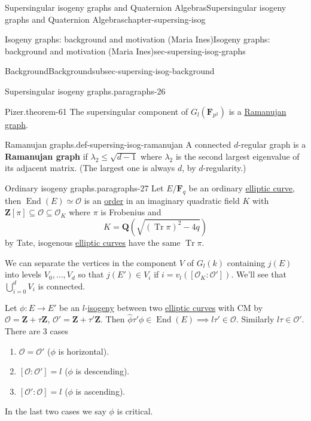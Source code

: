 \documentclass[oneside,10pt,]{book}
\newcommand{\terminology}[1]{\textbf{#1}}
\numberwithin{equation}{section}
\newcommand{\lb}{[}
\newcommand{\rb}{]}
\newcommand{\ZZ}{\mathbf{Z}}
\newcommand{\QQ}{\mathbf{Q}}
\newcommand{\FF}{\mathbf{F}}
\newcommand{\ints}{\mathcal{O}}
\DeclareMathOperator{\End}{End}
\DeclareMathOperator{\trace}{Tr}
\begin{document}
\begin{chapterptx}{Supersingular isogeny graphs and Quaternion Algebras}{}{Supersingular isogeny graphs and Quaternion Algebras}{}{}{chapter-supersing-isog}
\begin{sectionptx}{Isogeny graphs: background and motivation (Maria Ines)}{}{Isogeny graphs: background and motivation (Maria Ines)}{}{}{sec-supersing-isog-graphs}
\begin{subsectionptx}{Background}{}{Background}{}{}{subsec-supersing-isog-background}
\begin{paragraphs}{Supersingular isogeny graphs.}{paragraphs-26}
\begin{theorem}{Pizer.}{}{theorem-61}
\hypertarget{p-807}{}%
The supersingular component of \(G_l(\FF_{p^2})\) is a \hyperref[def-supersing-isog-ramanujan]{Ramanujan graph}.%
\end{theorem}
\begin{definition}{Ramanujan graphs.}{def-supersing-isog-ramanujan}%
\hypertarget{p-808}{}%
A connected \(d\)-regular graph is a \terminology{Ramanujan graph} if \(\lambda_2 \le \sqrt{d-1}\) where \(\lambda_2\) is the second largest eigenvalue of its adjacent matrix. (The largest one is always \(d\), by \(d\)-regularity.)%
\end{definition}
\end{paragraphs}%
\begin{paragraphs}{Ordinary isogeny graphs.}{paragraphs-27}%
\hypertarget{p-809}{}%
Let \(E/\FF_q\) be an ordinary \hyperref[def-supersing-isog-ec]{elliptic curve}, then \(\End(E) \simeq \ints\) is an \hyperref[def-order-quaternion]{order} in an imaginary quadratic field \(K\) with \(\ZZ\lb \pi \rb \subseteq \ints \subseteq \ints_K\) where \(\pi\) is Frobenius and%
\begin{equation*}
K = \QQ(\sqrt{(\trace \pi)^2 - 4q})
\end{equation*}
by Tate, isogenous \hyperref[def-supersing-isog-ec]{elliptic curves} have the same \(\trace \pi\).%
\par
\hypertarget{p-810}{}%
We can separate the vertices in the component \(V\) of \(G_l(k)\) containing \(j(E)\) into levels \(V_0, \ldots, V_d\) so that \(j(E') \in V_i\) if \(i = v_l(\lb \ints_K : \ints'\rb)\). We'll see that \(\bigcup_{i=0}^d V_i\) is connected.%
\par
\hypertarget{p-811}{}%
Let \(\phi\colon E\to E'\) be an \(l\)-\hyperref[def-supersing-isog-isog]{isogeny} between two \hyperref[def-supersing-isog-ec]{elliptic curves} with CM by \(\ints = \ZZ+\tau\ZZ\), \(\ints ' = \ZZ+\tau'\ZZ\). Then \(\hat\phi \tau' \phi \in \End(E) \implies l\tau ' \in \ints\). Similarly \(l\tau \in \ints'\). There are 3 cases\leavevmode%
\begin{enumerate}
\item\hypertarget{li-194}{}\(\ints = \ints'\) (\(\phi\) is horizontal).%
\item\hypertarget{li-195}{}\(\lb\ints : \ints' \rb = l\) (\(\phi\) is descending).%
\item\hypertarget{li-196}{}\(\lb\ints' : \ints \rb = l\) (\(\phi\) is ascending).%
\end{enumerate}
In the last two cases we say \(\phi\) is critical.%
\end{paragraphs}%

\end{subsectionptx}
\end{sectionptx}
\end{chapterptx}
\end{document}
